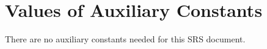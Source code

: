 \documentclass[12pt]{article}
\begin{document}

\section{Values of Auxiliary Constants}

There are no auxiliary constants needed for this SRS document.

\newpage


\printbibliography[heading=bibintoc]
\end{document}
